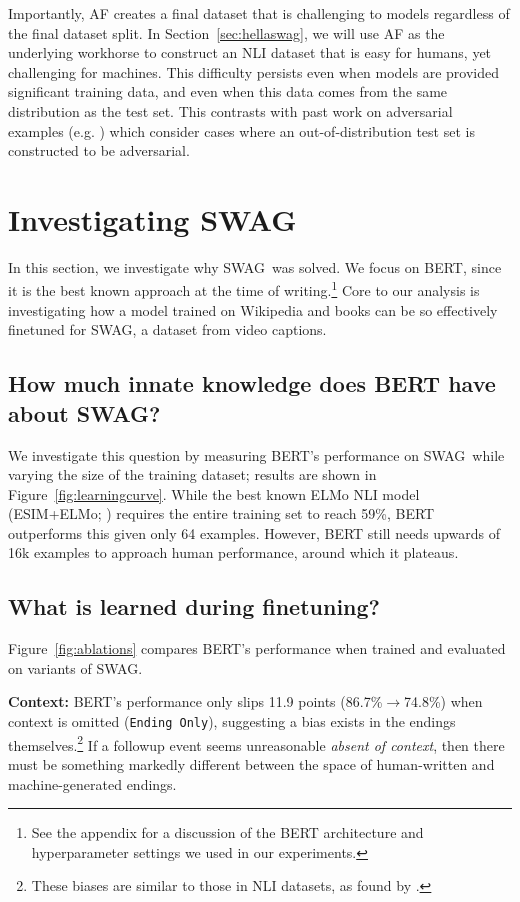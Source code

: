 Importantly, AF creates a final dataset that is challenging to models regardless of the final dataset split. In Section~\ref{sec:hellaswag}, we will use AF as the underlying workhorse to construct an NLI dataset that is easy for humans, yet challenging for machines. This difficulty persists even when models are provided significant training data, and even when this data comes from the same distribution as the test set. This contrasts with past work on adversarial examples (e.g.  \citealp{jia2017adversarial, glockner2018breaking, belinkov2018noise}) which consider cases where an out-of-distribution test set is constructed to be adversarial.

\section{Investigating SWAG}

In this section, we investigate why {SWAG}~was solved. We focus on BERT, since it is the best known approach at the time of writing.\footnote{See the appendix for a discussion of the BERT architecture and hyperparameter settings we used in our experiments.} Core to our analysis is investigating how a model trained on Wikipedia and books can be so effectively finetuned for SWAG, a dataset from video captions. 

\subsection{How much innate knowledge does BERT have about SWAG?}

We investigate this question by measuring BERT's performance on {SWAG}~while varying the size of the training dataset; results are shown in Figure~\ref{fig:learningcurve}. While the best known ELMo NLI model (ESIM+ELMo; \citealp{chen2017enhanced}) requires the entire training set to reach 59\%, BERT outperforms this given only 64 examples. However, BERT still needs upwards of 16k examples to approach human performance, around which it plateaus.

\subsection{What is learned during finetuning?}

Figure~\ref{fig:ablations} compares BERT's performance when trained and evaluated on variants of {SWAG}. 

 \textbf{Context:} BERT's performance only slips 11.9 points (86.7\%$\rightarrow$74.8\%) when context is omitted (\texttt{Ending Only}), suggesting a bias exists in the endings themselves.\footnote{These biases are similar to those in NLI datasets, as found by \citet{gururangan2018annotation, poliak_hypothesis_2018}.} If a followup event seems unreasonable \emph{absent of context}, then there must be something markedly different between the space of human-written and machine-generated endings. 

